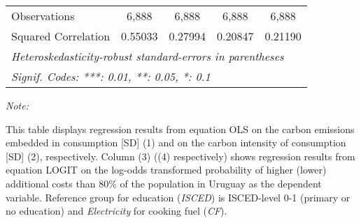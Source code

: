 \begin{table}[htbp!]
\begin{adjustbox}{width = 1\textwidth, max height = 0.95\textheight, center}
\begin{threeparttable}[b]
\begin{tabular}{lcccc}
            Observations         & 6,888              & 6,888              & 6,888          & 6,888\\  
            Squared Correlation  & 0.55033            & 0.27994            & 0.20847        & 0.21190\\  
            \midrule \midrule
            \multicolumn{5}{l}{\emph{Heteroskedasticity-robust standard-errors in parentheses}}\\
            \multicolumn{5}{l}{\emph{Signif. Codes: ***: 0.01, **: 0.05, *: 0.1}}\\
         \end{tabular}
         
         \begin{tablenotes}\item \medskip \textit{Note:}
            \item This table displays regression results from equation OLS on the carbon emissions embedded in consumption [SD] (1) and on the carbon intensity of consumption [SD] (2), respectively. 
                                      Column (3) ((4) respectively) shows regression results from equation LOGIT on the log-odds transformed probability of higher (lower) additional costs than 80\% of the population in Uruguay as the dependent variable. Reference group for education (\textit{ISCED}) is ISCED-level 0-1 (primary or no education) and \textit{Electricity} for cooking fuel (\textit{CF}).
         \end{tablenotes}
      \end{threeparttable}
   \end{adjustbox}
\end{table}


